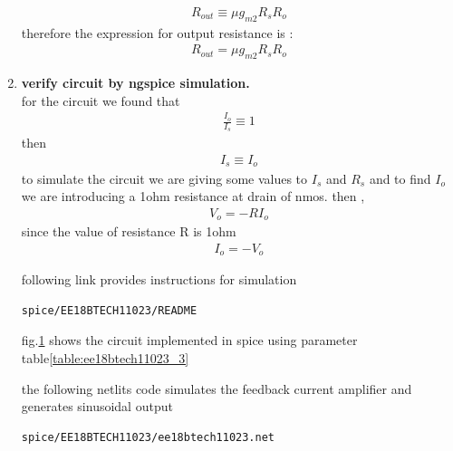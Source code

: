 \begin{enumerate}[label=\thesection.\arabic*.,ref=\thesection.\theenumi]
\begin{align}
    R_{out} \equiv \mu g_{m2}R_s R_o
     \label{eq_ee18btech11023_49}
\end{align}
therefore the expression for output resistance is :
\begin{align}
    R_{out} = \mu g_{m2}R_s R_o
     \label{eq_ee18btech11023_50}
\end{align}
\item
\textbf{
verify circuit by ngspice simulation.}\\
for the circuit we found that 
\begin{align}
    \frac{I_o}{I_s} \equiv 1 
    \label{eq_ee18btech11023_51}
\end{align}
then 
\begin{align}
    I_s \equiv I_o
\end{align}
to simulate the circuit we are giving some values to $I_s$ and $R_s$
and to find $I_o$ we are introducing a  1ohm resistance at drain of nmos.
then , 
\begin{align}
    V_o = -RI_o
    \label{eq_ee18btech11023_52}
\end{align}
since the value of resistance R is 1ohm
\begin{align}
    I_o = -V_o
    \label{eq_ee18btech11023_53}
\end{align}
\begin{table}[]
    \centering
  	\resizebox{\columnwidth}{!}{}
    \caption{}
    \label{table:ee18btech11023_3}
\end{table}
following link provides instructions for simulation
 \begin{lstlisting}
spice/EE18BTECH11023/README
\end{lstlisting}
fig.\ref{fig:spice fig} shows the circuit implemented in spice using parameter table\ref{table:ee18btech11023_3}
\begin{figure}[!ht]
	\begin{center}
			\resizebox{\columnwidth}{!}{}
	\end{center}
\caption{}
\label{fig:spice fig}
\end{figure}



the following netlits code simulates the feedback current amplifier and generates sinusoidal output 
 \begin{lstlisting}
spice/EE18BTECH11023/ee18btech11023.net
\end{lstlisting}


\end{enumerate}

